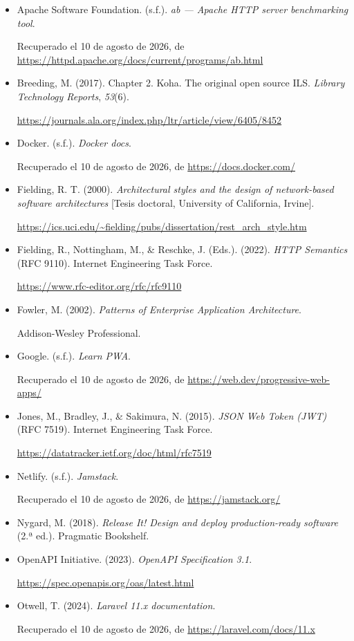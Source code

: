 \documentclass[12pt,a4paper]{article}
\begin{document}
\begin{itemize}[leftmargin=1.5cm, itemindent=-1.5cm, itemsep=5pt]
  \item \hypertarget{ref:apache}{Apache Software Foundation. (s.f.). \textit{ab --- Apache HTTP server benchmarking tool}.} Recuperado el 10 de agosto de 2026, de \url{https://httpd.apache.org/docs/current/programs/ab.html}
  \item \hypertarget{ref:breeding}{Breeding, M. (2017). Chapter 2. Koha. The original open source ILS. \textit{Library Technology Reports}, \textit{53}(6).} \url{https://journals.ala.org/index.php/ltr/article/view/6405/8452}
  \item \hypertarget{ref:docker}{Docker. (s.f.). \textit{Docker docs}.} Recuperado el 10 de agosto de 2026, de \url{https://docs.docker.com/}
  \item \hypertarget{ref:fielding2000}{Fielding, R. T. (2000). \textit{Architectural styles and the design of network-based software architectures} [Tesis doctoral, University of California, Irvine].} \url{https://ics.uci.edu/~fielding/pubs/dissertation/rest_arch_style.htm}
  \item \hypertarget{ref:fielding2022}{Fielding, R., Nottingham, M., \& Reschke, J. (Eds.). (2022). \textit{HTTP Semantics} (RFC 9110). Internet Engineering Task Force.} \url{https://www.rfc-editor.org/rfc/rfc9110}
  \item \hypertarget{ref:fowler}{Fowler, M. (2002). \textit{Patterns of Enterprise Application Architecture}.} Addison-Wesley Professional.
  \item \hypertarget{ref:google}{Google. (s.f.). \textit{Learn PWA}.} Recuperado el 10 de agosto de 2026, de \url{https://web.dev/progressive-web-apps/}
  \item \hypertarget{ref:jones2015}{Jones, M., Bradley, J., \& Sakimura, N. (2015). \textit{JSON Web Token (JWT)} (RFC 7519). Internet Engineering Task Force.} \url{https://datatracker.ietf.org/doc/html/rfc7519}
  \item \hypertarget{ref:netlify}{Netlify. (s.f.). \textit{Jamstack}.} Recuperado el 10 de agosto de 2026, de \url{https://jamstack.org/}
  \item \hypertarget{ref:nygard}{Nygard, M. (2018). \textit{Release It! Design and deploy production-ready software} (2.ª ed.). Pragmatic Bookshelf.}
  \item \hypertarget{ref:openapi}{OpenAPI Initiative. (2023). \textit{OpenAPI Specification 3.1}.} \url{https://spec.openapis.org/oas/latest.html}
  \item \hypertarget{ref:otwell}{Otwell, T. (2024). \textit{Laravel 11.x documentation}.} Recuperado el 10 de agosto de 2026, de \url{https://laravel.com/docs/11.x}

\end{itemize}
\end{document}
